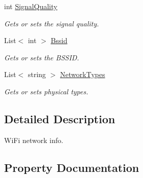 \begin{DoxyCompactItemize}
int \hyperlink{class_microsoft_1_1_tools_1_1_windows_device_portal_1_1_device_portal_1_1_wifi_network_info_a2ca448a6edb3046da8bb016f27ce794f}{Signal\+Quality}
\begin{DoxyCompactList}\small\item\em Gets or sets the signal quality. \end{DoxyCompactList}\item 
List$<$ int $>$ \hyperlink{class_microsoft_1_1_tools_1_1_windows_device_portal_1_1_device_portal_1_1_wifi_network_info_a0939a5e1fc509900a0669270c4e84d55}{Bssid}
\begin{DoxyCompactList}\small\item\em Gets or sets the B\+S\+S\+ID. \end{DoxyCompactList}\item 
List$<$ string $>$ \hyperlink{class_microsoft_1_1_tools_1_1_windows_device_portal_1_1_device_portal_1_1_wifi_network_info_a915109356c3f320493f28d1a315e90a2}{Network\+Types}
\begin{DoxyCompactList}\small\item\em Gets or sets physical types. \end{DoxyCompactList}\end{DoxyCompactItemize}


\subsection{Detailed Description}
Wi\+Fi network info. 



\subsection{Property Documentation}
